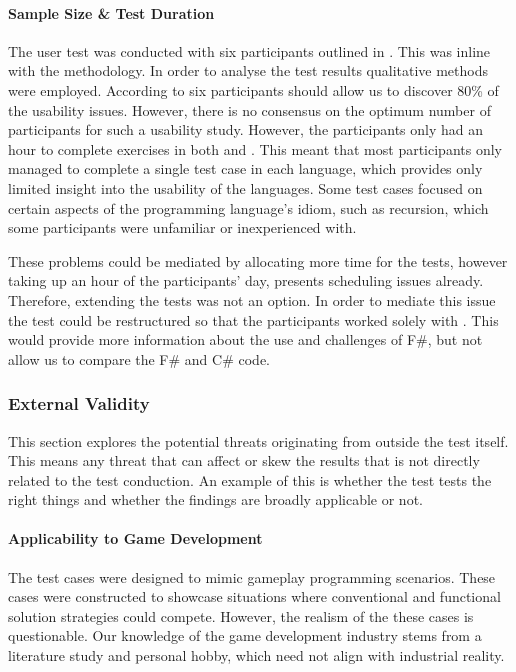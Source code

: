 \paragraph{Sample Size \& Test Duration}
The user test was conducted with six participants outlined in . This was inline with the \champagne methodology. In order to analyse the test results qualitative methods were employed. According to \cite{virzi1992refining} six participants should allow us to discover 80\% of the usability issues. However, there is no consensus on the optimum number of participants for such a usability study\cite{hwang2010number}. However, the participants only had an hour to complete exercises in both \fs and \cs. This meant that most participants only managed to complete a single test case in each language, which provides only limited insight into the usability of the languages. Some test cases focused on certain aspects of the programming language's idiom, such as recursion, which some participants were unfamiliar or inexperienced with.

These problems could be mediated by allocating more time for the tests, however taking up an hour of the participants' day, presents scheduling issues already. Therefore, extending the tests was not an option. In order to mediate this issue the test could be restructured so that the participants worked solely with \fs. This would provide more information about the use and challenges of F\#, but not allow us to compare the F\# and C\# code.

\subsubsection{External Validity}
This section explores the potential threats originating from outside the test itself. This means any threat that can affect or skew the results that is not directly related to the test conduction. An example of this is whether the test tests the right things and whether the findings are broadly applicable or not.

\paragraph{Applicability to Game Development}
The test cases were designed to mimic gameplay programming scenarios. These cases were constructed to showcase situations where conventional and functional solution strategies could compete. However, the realism of the these cases is questionable. Our knowledge of the game development industry stems from a literature study and personal hobby, which need not align with industrial reality.

